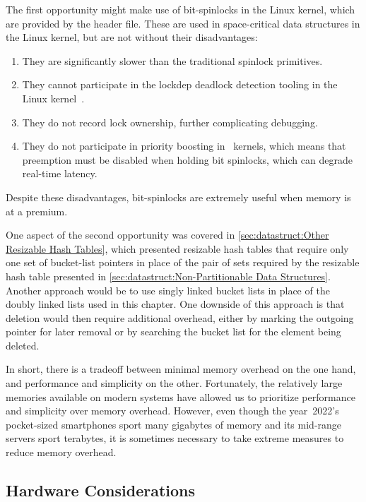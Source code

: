 The first opportunity might make use of bit-spinlocks in the Linux
kernel, which are provided by the 
header file.
These are used in space-critical data structures in the Linux kernel,
but are not without their disadvantages:

\begin{enumerate}
\item	They are significantly slower than the traditional spinlock
	primitives.
\item	They cannot participate in the lockdep deadlock detection
	tooling in the Linux kernel~\cite{JonathanCorbet2006lockdep}.
\item	They do not record lock ownership, further complicating
	debugging.
\item	They do not participate in priority boosting in \rt\ kernels,
	which means that preemption must be disabled when holding
	bit spinlocks, which can degrade real-time latency.
\end{enumerate}

Despite these disadvantages, bit-spinlocks are extremely useful when
memory is at a premium.

One aspect of the second opportunity was covered in
\cref{sec:datastruct:Other Resizable Hash Tables},
which presented resizable hash tables that require only one
set of bucket-list pointers in place of the pair of sets required
by the resizable hash table presented in
\cref{sec:datastruct:Non-Partitionable Data Structures}.
Another approach would be to use singly linked bucket lists in
place of the doubly linked lists used in this chapter.
One downside of this approach is that deletion would then require
additional overhead, either by marking the outgoing pointer
for later removal
or by searching the bucket list for the element being deleted.

In short, there is a tradeoff between minimal memory overhead on
the one hand, and performance and simplicity on the other.
Fortunately, the relatively large memories available on modern
systems have allowed us to prioritize performance and simplicity
over memory overhead.
However, even though the year~2022's pocket-sized smartphones sport
many gigabytes of memory and its mid-range servers sport terabytes, it
is sometimes necessary to take extreme measures to reduce memory overhead.

\subsection{Hardware Considerations}
\label{sec:datastruct:Hardware Considerations}


